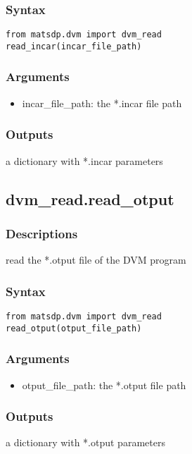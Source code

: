 \documentclass[12pt]{book}
\begin{document}
\subsubsection{Syntax}
\begin{lstlisting}
from matsdp.dvm import dvm_read
read_incar(incar_file_path)
\end{lstlisting}

\subsubsection{Arguments}
\begin{itemize}
\item incar\_file\_path: the *.incar file path
\end{itemize}

\subsubsection{Outputs}
a dictionary with *.incar parameters


\subsection{dvm\_read.read\_otput}

\subsubsection{Descriptions}
read the *.otput file of the DVM program
\subsubsection{Syntax}
\begin{lstlisting}
from matsdp.dvm import dvm_read
read_otput(otput_file_path)
\end{lstlisting}

\subsubsection{Arguments}
\begin{itemize}
\item otput\_file\_path: the *.otput file path
\end{itemize}

\subsubsection{Outputs}
a dictionary with *.otput parameters
\end{document}
